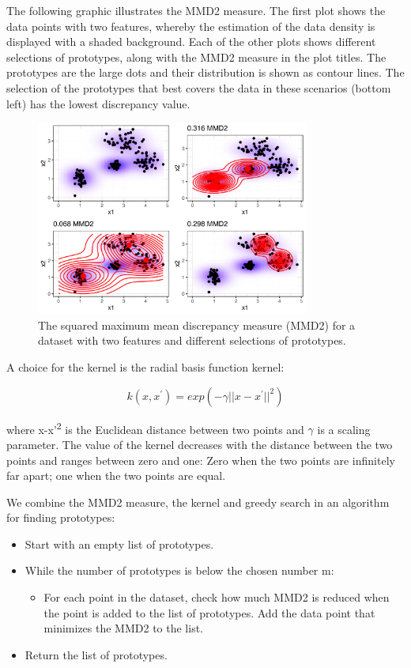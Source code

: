 \documentclass[
  11pt,
]{scrbook}
\providecommand{\tightlist}{%
  \setlength{\itemsep}{0pt}\setlength{\parskip}{0pt}}
\begin{document}
The following graphic illustrates the MMD2 measure.
The first plot shows the data points with two features, whereby the estimation of the data density is displayed with a shaded background.
Each of the other plots shows different selections of prototypes, along with the MMD2 measure in the plot titles.
The prototypes are the large dots and their distribution is shown as contour lines.
The selection of the prototypes that best covers the data in these scenarios (bottom left) has the lowest discrepancy value.

\begin{figure}

{\centering \includegraphics[width=0.8\textwidth]{images/mmd-1} 

}

\caption{The squared maximum mean discrepancy measure (MMD2) for a dataset with two features and different selections of prototypes.}\label{fig:mmd}
\end{figure}

A choice for the kernel is the radial basis function kernel:

\[k(x,x^\prime)=exp\left(-\gamma||x-x^\prime||^2\right)\]

where \textbar\textbar x-x'\textbar\textbar{}\textsuperscript{2} is the Euclidean distance between two points and \(\gamma\) is a scaling parameter.
The value of the kernel decreases with the distance between the two points and ranges between zero and one:
Zero when the two points are infinitely far apart;
one when the two points are equal.

We combine the MMD2 measure, the kernel and greedy search in an algorithm for finding prototypes:

\begin{itemize}
\tightlist
\item
  Start with an empty list of prototypes.
\item
  While the number of prototypes is below the chosen number m:

  \begin{itemize}
  \tightlist
  \item
    For each point in the dataset, check how much MMD2 is reduced when the point is added to the list of prototypes. Add the data point that minimizes the MMD2 to the list.
  \end{itemize}
\item
  Return the list of prototypes.
\end{itemize}
\end{document}
